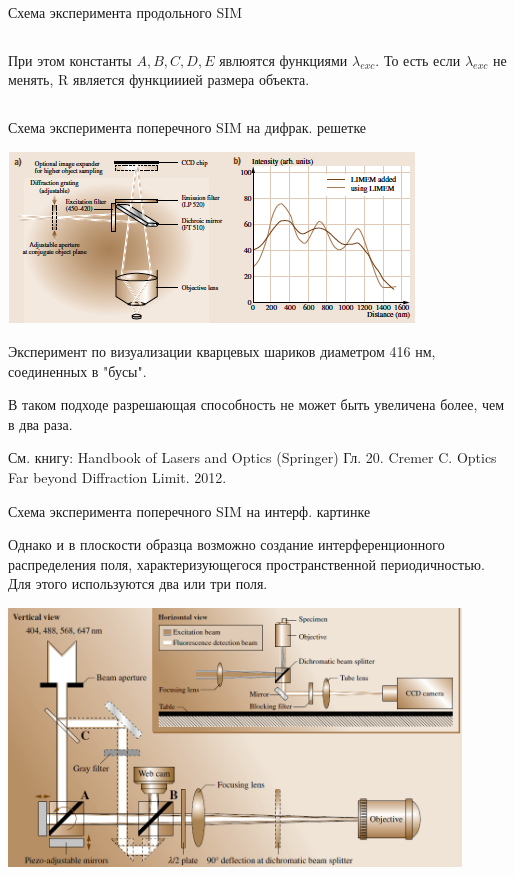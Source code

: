 \documentclass[9pt, compress, xcolor=table]{beamer}
\begin{document}
\begin{frame}{Схема эксперимента продольного SIM}
\begin{columns}[c]
\begin{center}
 При этом константы $A,B,C,D,E$ явлюятся функциями $\lambda_{exc}$. То есть если $\lambda_{exc}$ не менять, R является функцииией размера объекта.
 
\end{center}
\end{columns}
\end{frame}

\begin{frame}{Схема эксперимента поперечного SIM на дифрак. решетке}
\begin{center}
\includegraphics[width=\textwidth]{ffm05}
\end{center}

{\small Эксперимент по визуализации кварцевых шариков диаметром 416 нм, соединенных в "бусы". 

В таком подходе разрешающая способность не может быть увеличена более, чем в два раза.

См. книгу: Handbook of Lasers and Optics (Springer) Гл. 20. Cremer C. Optics Far beyond Diffraction Limit. 2012.}
\end{frame}

\begin{frame}{Схема эксперимента поперечного SIM на интерф. картинке}

Однако и в плоскости образца возможно создание интерференционного распределения поля, характеризующегося пространственной периодичностью. Для этого используются два или три поля.

\begin{center}
\includegraphics[width=0.9\textwidth]{sim23}
\end{center}
\end{frame}
\end{document}
